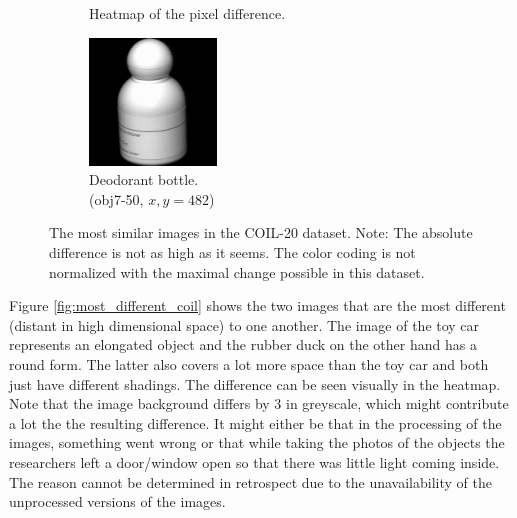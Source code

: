 \begin{figure}[!]
\begin{subfigure}[t]{0.32\columnwidth}
    	\caption{Heatmap of the pixel difference.}
        \label{fig:heatmap_coil20_best}
    \end{subfigure}
     \hfill
     \begin{subfigure}[t]{0.32\columnwidth}
    	\centering
    	\includegraphics[width=\columnwidth]{images/coil-20-proc/obj7__50.png}
    	\caption{Deodorant bottle. \\ (obj7-50, $x,y=482$)}
        \label{fig:obj7__50}
    \end{subfigure}
     \caption[Most Similar COIL-20 Images]{The most similar images in the COIL-20 dataset. Note: The absolute difference is not as high as it seems. The color coding is not normalized with the maximal change possible in this dataset.}
    \label{fig:most_similar_coil}
\end{figure}

Figure \ref{fig:most_different_coil} shows the two images that are the most different (distant in high dimensional space) to one another. The image of the toy car represents an elongated object and the rubber duck on the other hand has a round form. The latter also covers a lot more space than the toy car and both just have different shadings. The difference can be seen visually in the heatmap. Note that the image background differs by 3 in greyscale, which might contribute a lot the the resulting difference. It might either be that in the processing of the images, something went wrong or that while taking the photos of the objects the researchers left a door/window open so that there was little light coming inside. The reason cannot be determined in retrospect due to the unavailability of the unprocessed versions of the images.

